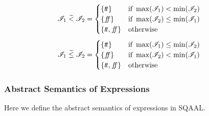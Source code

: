 \begin{align}\label{eq:aaabcomp2}
    \mathscr{I}_1 \;\aab{<}\; \mathscr{I}_2 &= \begin{cases}
        \{\true\} & \text{if } \max(\mathscr{I}_1) < \min(\mathscr{I}_2) \\
        \{\false\} & \text{if } \max(\mathscr{I}_2) \leq \min (\mathscr{I}_1) \\
        \{\true, \false\} & \text{otherwise}
    \end{cases}
\end{align}
\begin{align}\label{eq:aaabcomp3}
    \mathscr{I}_1 \;\aab{\leq}\; \mathscr{I}_2 &= \begin{cases}
        \{\true\} & \text{if } \max(\mathscr{I}_1) \leq \min(\mathscr{I}_2) \\
        \{\false\} & \text{if } \max(\mathscr{I}_2) < \min (\mathscr{I}_1) \\
        \{\true, \false\} & \text{otherwise}
    \end{cases}
\end{align}

\subsubsection{Abstract Semantics of Expressions}

Here we define the abstract semantics of expressions in SQAAL.

